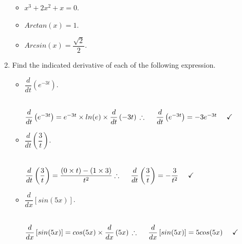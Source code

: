 \documentclass[fleqn]{article}
\begin{document}
\begin{enumerate}
\begin{itemize}
      \item $x^3+2x^2+x=0$.

      \item $Arctan (x)=1$.

      \item $Arcsin (x)=\dfrac{\sqrt{2}}{2}$.

    \end{itemize}

    \item Find the indicated derivative of each of the following expression.
    \begin{itemize}
      \item $\dfrac{d}{dt} \left(e^{-3t}\right)$.

        \textcolor{hwColor}{
          \\
          $
            \dfrac{d}{dt} \left(e^{-3t}\right)=e^{-3t} \times ln(e) \times \dfrac{d}{dt} \left(-3t\right)
            \\
            \\
            \\
            \therefore ~~~~ \dfrac{d}{dt} \left(e^{-3t}\right)=-3e^{-3t} ~~~~ \checkmark
            \\
          $
        }

      \item $\dfrac{d}{dt} \left(\dfrac{3}{t}\right)$.

        \textcolor{hwColor}{
          \\
          $
            \dfrac{d}{dt} \left(\dfrac{3}{t}\right)=\dfrac{(0 \times t)-(1 \times 3)}{t^2}
            \\
            \\
            \\
            \therefore ~~~~ \dfrac{d}{dt} \left(\dfrac{3}{t}\right)=-\dfrac{3}{t^2} ~~~~ \checkmark
            \\
          $
        }

      \item $\dfrac{d}{dx} \left[sin(5x)\right]$.

        \textcolor{hwColor}{
          \\
          $
            \dfrac{d}{dx} \left[sin(5x)\right]=cos(5x) \times \dfrac{d}{dx} \left(5x\right)
            \\
            \\
            \\
            \therefore ~~~~ \dfrac{d}{dx} \left[sin(5x)\right]=5cos(5x) ~~~~ \checkmark
            \\
          $
        }


\end{itemize}
\end{enumerate}
\end{document}
